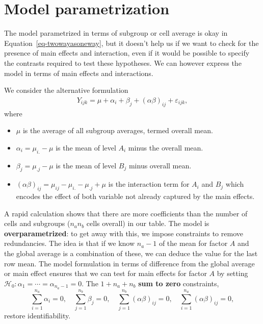 \documentclass[
  11pt,
  letterpaper,
]{scrbook}
\providecommand{\tightlist}{%
  \setlength{\itemsep}{0pt}\setlength{\parskip}{0pt}}\usepackage{longtable,booktabs,array}
\theoremstyle{definition}
\theoremstyle{remark}
\begin{document}
\hypertarget{model-parametrization}{%
\section{Model parametrization}\label{model-parametrization}}

The model parametrized in terms of subgroup or cell average is okay in
Equation~\ref{eq-twowayasoneway}, but it doesn't help us if we want to
check for the presence of main effects and interaction, even if it would
be possible to specify the contrasts required to test these hypotheses.
We can however express the model in terms of main effects and
interactions.

We consider the alternative formulation \begin{align*}
Y_{ijk} = \mu + \alpha_i + \beta_j + (\alpha\beta)_{ij} + \varepsilon_{ijk},
\end{align*} where

\begin{itemize}
\tightlist
\item
  \(\mu\) is the average of all subgroup averages, termed overall mean.
\item
  \(\alpha_i = \mu_{i.} - \mu\) is the mean of level \(A_i\) minus the
  overall mean.
\item
  \(\beta_j = \mu_{.j} - \mu\) is the mean of level \(B_j\) minus
  overall mean.
\item
  \((\alpha\beta)_{ij} = \mu_{ij} - \mu_{i.} - \mu_{.j} + \mu\) is the
  interaction term for \(A_i\) and \(B_j\) which encodes the effect of
  both variable not already captured by the main effects.
\end{itemize}

A rapid calculation shows that there are more coefficients than the
number of cells and subgroups (\(n_an_b\) cells overall) in our table.
The model is \textbf{overparametrized}: to get away with this, we impose
constraints to remove redundancies. The idea is that if we know
\(n_a-1\) of the mean for factor \(A\) and the global average is a
combination of these, we can deduce the value for the last row mean. The
model formulation in terms of difference from the global average or main
effect ensures that we can test for main effects for factor \(A\) by
setting \(\mathscr{H}_0: \alpha_1 = \cdots = \alpha_{n_a-1}=0\). The
\(1 + n_a + n_b\) \textbf{sum to zero} constraints,
\[\sum_{i=1}^{n_a} \alpha_i=0, \quad \sum_{j=1}^{n_b} \beta_j=0, \quad  \sum_{j=1}^{n_b} (\alpha\beta)_{ij}=0, \quad \sum_{i=1}^{n_a} (\alpha\beta)_{ij}=0,\]
restore identifiability.
\end{document}
